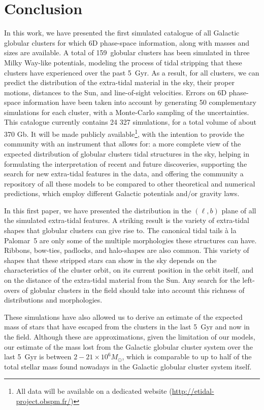 \section{Conclusion}
    In this work, we have presented the first simulated catalogue of  all Galactic globular clusters for which 6D phase-space information, along with masses and sizes are available. A total of 159~globular clusters has been simulated in three Milky Way-like potentials, modeling  the process of tidal stripping that these clusters have experienced over the past 5~Gyr.  As a result, for all clusters, we can predict the distribution of the extra-tidal material in the sky, their proper motions,  distances to the Sun, and line-of-sight velocities. Errors on 6D phase-space  information have been taken into account by generating 50 complementary simulations for each cluster, with a Monte-Carlo sampling of the uncertainties.  This catalogue currently contains 24 327 simulations, for a total volume of about 370 Gb. It will be made publicly available\footnote{All data will be available on a dedicated website (\url{http://etidal-project.obspm.fr/})}, with the intention to provide the community with an instrument that allows for:  a more complete view of the expected distribution of globular clusters tidal structures in the sky,  helping in formulating the interpretation of recent and future discoveries,  supporting the search for new extra-tidal features in the data, and offering the community a repository of all these models to be compared to other theoretical and numerical predictions, which employ different Galactic potentials and/or gravity laws.

    In this first paper, we have presented the distribution in the $(\ell, b)$ plane of all the simulated extra-tidal features. A striking result is the variety of extra-tidal shapes that globular clusters can give rise to. The canonical tidal tails \`a la Palomar~5 are only some of the multiple morphologies these structures can have. Ribbons, bow-ties, padlocks, and halo-shapes are also common. This variety of shapes that these stripped stars can show in the sky depends on the characteristics of the cluster orbit, on its current position in the orbit itself, and on the distance of the extra-tidal material from the Sun. Any search for the left-overs of globular clusters in the field should take into account this richness of distributions and morphologies. 

    These simulations have also allowed us to derive an estimate of the expected mass of stars that have escaped from the clusters in the last 5~Gyr and now in the field. Although these are approximations, given the limitation of our models, our estimate of the mass lost from the Galactic globular cluster system over the last 5~Gyr is between $2-21\times 10^6 M_{\odot}$, which is comparable to up to half of the total stellar mass found nowadays in the Galactic globular cluster system itself. 

